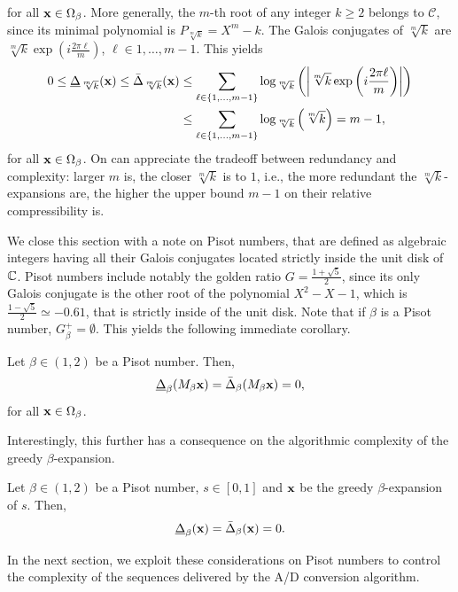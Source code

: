 	for all ${\bf x} \in \Omega_\beta$. More generally, the $m$-th root of any integer $k \geq 2$ belongs to $\mathscr C$, since its minimal polynomial is $P_{\sqrt[m]{k}} = X^m - k$. The Galois conjugates of $\sqrt[m]{k}$ are $\sqrt[m]{k} \exp\left(i \frac{2\pi \ell}{m}\right)$, $\ell \in 1, \ldots, m - 1$. This yields
	\begin{align}
		0 \leq \underline\Delta_{\sqrt[m]{k}}({\bf x}) \leq \bar\Delta_{\sqrt[m]{k}}({\bf x}) &\leq \sum_{\ell \in \{1,\ldots,m-1\}} \log_{\sqrt[m]{k}}\left( \left|\sqrt[m]{k} \exp\left(i \frac{2\pi \ell}{m}\right)\right|\right)\\
		& \leq \sum_{\ell \in \{1,\ldots,m-1\}} \log_{\sqrt[m]{k}}\left( \sqrt[m]{k}\right) = m-1,
	\end{align}
	for all ${\bf x} \in \Omega_\beta$. On can appreciate the tradeoff between redundancy and complexity: larger $m$ is, the closer $\sqrt[m]{k}$ is to $1$, i.e., the more redundant the $\sqrt[m]{k}$-expansions are, the higher the upper bound $m-1$ on their relative compressibility is.

	We close this section with a note on Pisot numbers, that are defined as algebraic integers having all their Galois conjugates located strictly inside the unit disk of $\mathbb{C}$. Pisot numbers include notably the golden ratio $G = \frac{1 +\sqrt{5}}{2}$, since its only Galois conjugate is the other root of the polynomial $X^2 - X - 1$, which is $\frac{1 - \sqrt{5}}{2} \simeq -0.61$, that is strictly inside of the unit disk. Note that if $\beta$ is a Pisot number, $G^+_\beta = \emptyset$. This yields the following immediate corollary.
	\begin{corollary}\label{cor:upper bound on the relative compressibility of beta expansions for pisot beta}
		Let $\beta \in (1,2)$ be a Pisot number. Then,
		\begin{equation}
			\underline\Delta_\beta(M_\beta{\bf x}) = \bar\Delta_\beta(M_\beta{\bf x}) = 0,
		\end{equation}
		for all ${\bf x} \in \Omega_\beta$.
	\end{corollary}
	Interestingly, this further has a consequence on the algorithmic complexity of the greedy $\beta$-expansion.
	\begin{corollary}\label{cor:upper bound on the relative compressibility of greedy beta expansions for pisot beta}
		Let $\beta \in (1,2)$ be a Pisot number, $s\in [0,1]$ and ${\bf x}$ be the greedy $\beta$-expansion of $s$. Then,
		\begin{equation}
			\underline\Delta_\beta({\bf x}) = \bar\Delta_\beta({\bf x}) = 0.
		\end{equation}
	\end{corollary}
	In the next section, we exploit these considerations on Pisot numbers to control the complexity of the sequences delivered by the A/D conversion algorithm.
	
